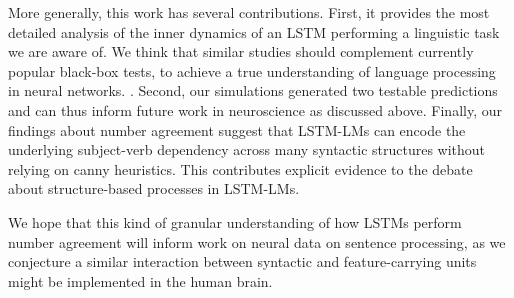 More generally, this work has several contributions. First, it provides the most detailed analysis of the inner dynamics of an LSTM performing a linguistic task we are aware of. We think that similar studies should complement currently popular black-box tests, to achieve a true understanding of language processing in neural networks. . Second, our simulations generated two testable predictions and can thus inform future work in neuroscience as discussed above. Finally, our findings about number agreement suggest that LSTM-LMs can encode the underlying subject-verb dependency across many syntactic structures without relying on canny heuristics. This contributes explicit evidence to the debate about structure-based processes in LSTM-LMs.


We hope that this kind of granular understanding of how LSTMs perform number agreement will inform work on neural data on sentence processing, as we conjecture a similar interaction between syntactic and feature-carrying units might be implemented in the human brain.


